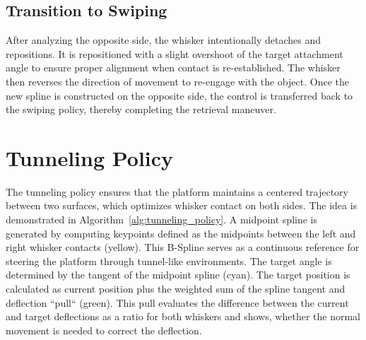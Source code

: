 \subsection{Transition to Swiping}
After analyzing the opposite side, the whisker intentionally detaches and repositions.
It is repositioned with a slight overshoot of the target attachment angle to ensure proper alignment when contact is re-established.
The whisker then reverses the direction of movement to re-engage with the object.
Once the new spline is constructed on the opposite side, the control is transferred back to the swiping policy, thereby completing the retrieval maneuver.


\section{Tunneling Policy}

The tunneling policy ensures that the platform maintains a centered trajectory between two surfaces, which optimizes whisker contact on both sides.
The idea is demonstrated in Algorithm~\ref{alg:tunneling_policy}.
A midpoint spline is generated by computing keypoints defined as the midpoints between the left and right whisker contacts (yellow).
This B-Spline serves as a continuous reference for steering the platform through tunnel-like environments.
The target angle is determined by the tangent of the midpoint spline (cyan).
The target position is calculated as current position plus the weighted sum of the spline tangent and deflection “pull“ (green).
This pull evaluates the difference between the current and target deflections as a ratio for both whiskers and shows, whether the normal movement is needed to correct the deflection.


